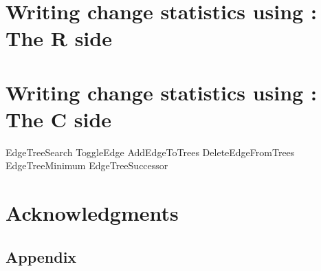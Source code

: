 \documentclass[article]{jss}
\begin{document}
\section[Writing change statistics using ergmuserterms:  The R side]%
{Writing change statistics using :  The R side}
\label{Rside}

\section[Writing change statistics using ergmuserterms:  The C side]%
{Writing change statistics using :  The C side}
\label{Cside}

EdgeTreeSearch
ToggleEdge
AddEdgeToTrees
DeleteEdgeFromTrees
EdgeTreeMinimum
EdgeTreeSuccessor





\section*{Acknowledgments}





\newpage

\begin{appendix}


\section[appendix]{Appendix}
\label{appendix}

\end{appendix}
\end{document}
